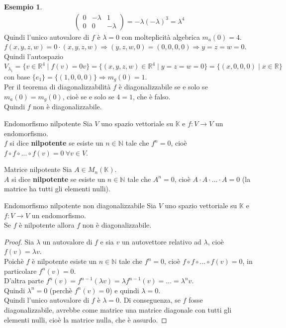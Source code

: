 \documentclass[a4paper]{article}
\theoremstyle{definition}
\newtheorem*{es}{Esempio}
\begin{document}
\begin{es}
\begin{align*}
\begin{pmatrix}
				0 & - \lambda & 1 \\
				0 & 0 & - \lambda
			\end{pmatrix} = - \lambda (- \lambda)^3 = \lambda^4
		\end{align*}
		Quindi l'unico autovalore di $f$ è $\lambda = 0$ con molteplicità algebrica $m_a(0) = 4$. \\
		$f(x, y, z, w) = 0 \cdot (x, y, z, w) \Rightarrow (y, z, w, 0) = (0, 0, 0, 0) \Rightarrow y = z = w = 0$.
		Quindi l'autospazio $V_{\lambda_1} = \{v \in \mathbb{R}^4 \mid f(v) = 0v\} = \{(x, y, z, w) \in \mathbb{R}^4 \mid y = z = w = 0\} = \{(x, 0, 0, 0) \mid x \in \mathbb{R}\}$
		con base $\{e_1\} = \{(1, 0, 0, 0)\} \Rightarrow m_g(0) = 1$. \\
		Per il teorema di diagonalizzabilità $f$ è diagonalizzabile se e solo se $m_a(0) = m_g(0)$, cioè se e solo se $4 = 1$, che è falso. \\
		Quindi $f$ non è diagonalizzabile.
	\end{es}

	\begin{deff}{Endomorfismo nilpotente}{}
		Sia $V$ uno spazio vettoriale su $\mathbb{K}$ e $f: V \to V$ un endomorfismo. \\
		$f$ si dice \textbf{nilpotente} se esiste un $n \in \mathbb{N}$ tale che $f^n = 0$, cioè $f \circ f \circ ... \circ f(v) = 0 \ \forall v \in V$.
	\end{deff}
	\begin{deff}{Matrice nilpotente}{}
		Sia $A \in M_n(\mathbb{K})$. \\
		$A$ si dice \textbf{nilpotente} se esiste un $n \in \mathbb{N}$ tale che $A^n = 0$, cioè $A \cdot A \cdot ... \cdot A = 0$
		(la matrice ha tutti gli elementi nulli).
	\end{deff}

	\begin{teo}{Endomorfismo nilpotente non diagonalizzabile}{}
		Sia $V$ uno spazio vettoriale su $\mathbb{K}$ e $f: V \to V$ un endomorfismo. \\
		Se $f$ è nilpotente allora $f$ non è diagonalizzabile.
	\end{teo}
	\begin{proof}
		Sia $\lambda$ un autovalore di $f$ e sia $v$ un autovettore relativo ad $\lambda$, cioè $f(v) = \lambda v$. \\
		Poichè $f$ è nilpotente esiste un $n \in \mathbb{N}$ tale che $f^n = 0$, cioè $f \circ f \circ ... \circ f(v) = 0$, in
		particolare $f^n(v) = 0$. \\
		D'altra parte $f^n(v) = f^{n-1}(\lambda v) = \lambda f^{n-1}(v) = ... = \lambda^n v$. \\
		Quindi $\lambda^n = 0$ (perchè $f^n(v) = 0$) e quindi $\lambda = 0$. \\
		Quindi l'unico autovalore di $f$ è $\lambda = 0$. Di conseguenza, se $f$ fosse diagonalizzabile,
		avrebbe come matrice una matrice diagonale con tutti gli elementi nulli, cioè la matrice nulla, che è assurdo.
	\end{proof}
\end{document}
